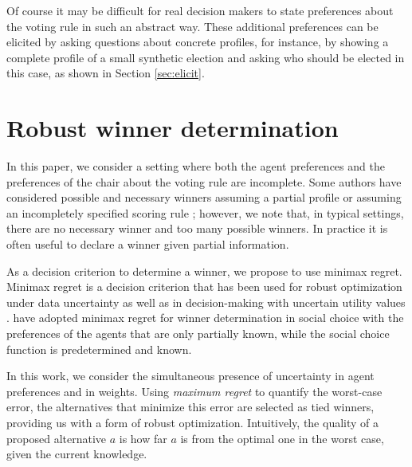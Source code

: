 \documentclass[sigconf, anonymous]{aamas}
\begin{document}
Of course it may be difficult for real decision makers to state preferences about the voting rule in such an abstract way.
These additional preferences can be elicited by asking questions about concrete profiles, for instance, by showing a complete profile of a small synthetic election and asking who should be elected in this case, as shown in Section \ref{sec:elicit}.

\section[Minimax regret under partial profile and weight information]{
	Robust winner determination}
\label{sec:mmr}
In this paper, we consider a setting where both the agent preferences and the preferences of the chair about the voting rule are incomplete.
Some authors have considered possible and necessary winners assuming a partial profile  \citep{Kalech2011,Xia2008} or assuming an incompletely specified scoring rule \citep{Stein1994};
however, we note that, in typical settings, there are no necessary winner and too many possible winners.
In practice it is often useful to declare a winner given partial information.

As a decision criterion to determine a winner, we propose to use minimax regret. 
Minimax regret \citep{Savage1954} is a decision criterion that has been used for robust optimization under data uncertainty \citep{Kouvelis1997} as well as in decision-making with uncertain utility values \citep{Salo2001,Boutilier2006}.
\citet{Lu2011} have adopted minimax regret for winner determination in social choice with
the preferences of the agents that are only partially known, while the social choice function is predetermined and known.

In this work, we consider the simultaneous presence of uncertainty in agent preferences and in weights.
Using {\em maximum regret} to quantify the worst-case error, the alternatives that minimize this error are selected as tied winners, providing us with a form of robust optimization.
Intuitively, the quality of a proposed alternative $a$ is how far $a$ is from the optimal one in the worst case, given the current knowledge.
\end{document}
